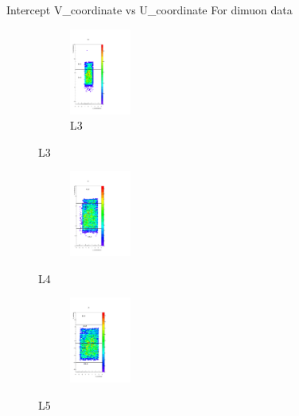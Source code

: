 \documentclass[xcolor=dvipsnames]{beamer}
\begin{document}
 \begin{frame}{Intercept V\_coordinate vs U\_coordinate}
 	For dimuon data
 	\begin{multicols}{4}	
 		\begin{figure}[H]
 			\begin{center}				
 				\begin{subfigure}[b]{0.30\textwidth}
 					\includegraphics[width=2cm]{L3uv.pdf}
 					\caption*{L3}
 				\end{subfigure}				
 			\end{center}
 		\end{figure}
 		\begin{figure}[H]
 			\begin{center}				
 				\begin{subfigure}[b]{0.30\textwidth}
 					\includegraphics[width=2cm]{L4uv.pdf}
 				\end{subfigure}		
 				\caption*{L4}		
 			\end{center}
 		\end{figure}
 		\begin{figure}[H]
 			\begin{center}				
 				\begin{subfigure}[b]{0.30\textwidth}
 					\includegraphics[width=2cm]{L5uv.pdf}
 				\end{subfigure}		
 				\caption*{L5}		
 			\end{center}
 		\end{figure}
 		\begin{figure}[H]

\end{figure}
\end{multicols}
\end{frame}
\end{document}
